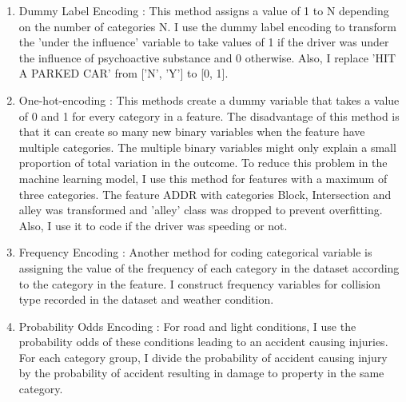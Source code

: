 \documentclass[a4paper,12pt]{article}
\begin{document}
\begin{enumerate}
  \item Dummy Label Encoding : This method assigns a value of 1 to N depending on the number of categories N. I use the dummy label encoding to transform the 'under the influence' variable to take values of 1 if the driver was under the influence of psychoactive substance and 0 otherwise. Also, I replace 'HIT A PARKED CAR' from ['N', 'Y'] to [0, 1].

  \item One-hot-encoding : This methods create a dummy variable that takes a value of 0 and 1 for every category in a feature. The disadvantage of this method is that it can create so many new binary variables when the feature have multiple categories. The multiple binary variables might only explain a small proportion of total variation in the outcome. To reduce this problem in the machine learning model, I use this method for features with a maximum of three categories. The feature ADDR with categories Block, Intersection and alley was transformed and 'alley' class was dropped to prevent overfitting. Also, I use it to code if the driver was speeding or not.

  \item Frequency Encoding : Another method for coding categorical variable is assigning the value of the frequency of each category in the dataset according to the category in the feature. I construct frequency variables for collision type recorded in the dataset and weather condition.

  \item Probability Odds Encoding : For road and light conditions, I use the probability odds of these conditions leading to an accident causing injuries. For each category group, I divide the probability of accident causing injury by the probability of accident resulting in damage to property in the same category.

\end{enumerate}
\end{document}
